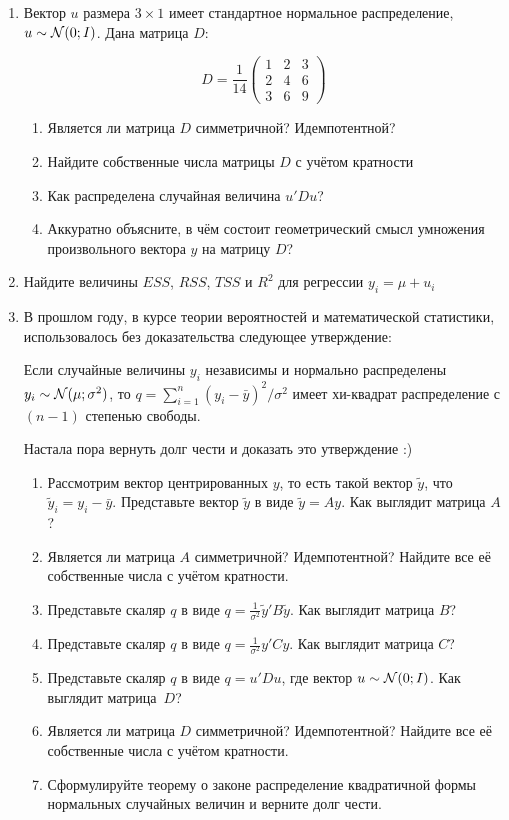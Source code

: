 \documentclass[12pt, a4paper]{article}\usepackage[]{graphicx}\usepackage[]{color}
\begin{document}
\begin{enumerate}
\item Вектор $u$ размера $3 \times 1$ имеет стандартное нормальное распределение, $u \sim \mathcal{N} (0; I)$. Дана матрица $D$:

\[
D = \frac{1}{14} \begin{pmatrix}
1 & 2 & 3 \\
2 & 4 & 6 \\
3 & 6 & 9
\end{pmatrix}
\]

\begin{enumerate}
  \item Является ли матрица $D$ симметричной? Идемпотентной?
  \item Найдите собственные числа матрицы $D$ с учётом кратности
  \item Как распределена случайная величина $u'Du$?
  \item Аккуратно объясните, в чём состоит геометрический смысл умножения произвольного вектора $y$ на матрицу $D$?
\end{enumerate}

\item Найдите величины $ESS$, $RSS$, $TSS$ и $R^2$ для регрессии $y_i = \mu + u_i$

\item В прошлом году, в курсе теории вероятностей и математической статистики, использовалось без доказательства следующее утверждение:

Если случайные величины $y_i$ независимы и нормально распределены $y_i \sim \mathcal{N} (\mu; \sigma^2)$, то $q = \sum_{i=1}^n (y_i - \bar y)^2 / \sigma^2$ имеет хи-квадрат распределение с $(n - 1)$ степенью свободы.

Настала пора вернуть долг чести и доказать это утверждение :)

\begin{enumerate}
  \item Рассмотрим вектор центрированных $y$, то есть такой вектор $\tilde y$, что $\tilde y_i = y_i - \bar y$. Представьте вектор $\tilde y$ в виде $\tilde y = A y$. Как выглядит матрица $A$?
  \item Является ли матрица $A$ симметричной? Идемпотентной? Найдите все её собственные числа с учётом кратности.
  \item Представьте скаляр $q$ в виде $q= \frac{1}{\sigma^2} \tilde y' B \tilde y$. Как выглядит матрица $B$?
  \item Представьте скаляр $q$ в виде $q= \frac{1}{\sigma^2} y' C y$. Как выглядит матрица $C$?
  \item Представьте скаляр $q$ в виде $q= u' D u$, где вектор $u \sim \mathcal{N}(0; I)$. Как выглядит матрица~$D$?
  \item Является ли матрица $D$ симметричной? Идемпотентной? Найдите все её собственные числа с учётом кратности.
  \item Сформулируйте теорему о законе распределение квадратичной формы нормальных случайных величин и верните долг чести.
\end{enumerate}


\end{enumerate}
\end{document}
